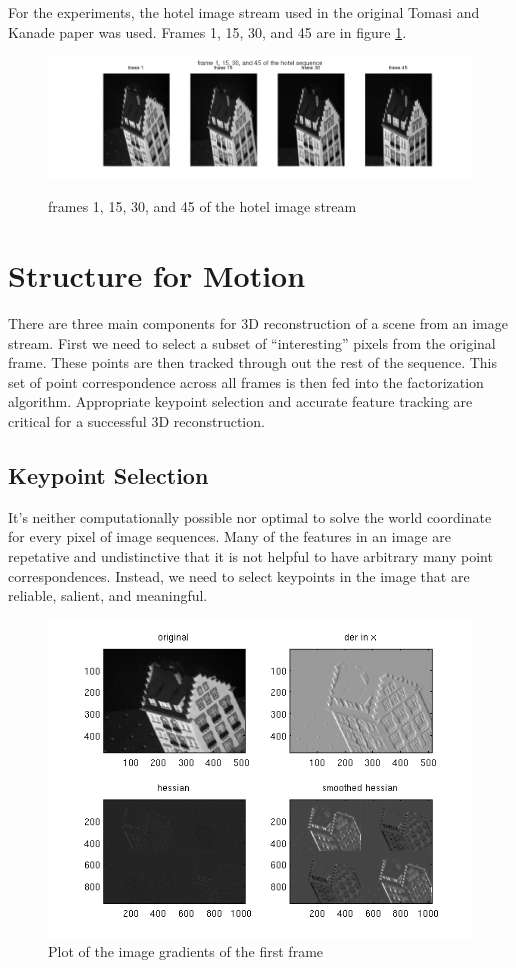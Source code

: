 For the experiments, the hotel image stream used in the original
Tomasi and Kanade paper was used. Frames 1, 15, 30, and 45 are
in figure \ref{fig:hotel}. 
\begin{figure}[!ht]
  \includegraphics[scale=0.5]{hotel.png}
\label{fig:hotel}
  \caption{frames 1, 15, 30, and 45 of the hotel image stream} 
\end{figure}
\section{Structure for Motion}
\label{sec:main}
There are three main components for 3D reconstruction of a scene from
an image stream. First we need to select a subset of
``interesting'' pixels from the original frame. These points are then
tracked through out the rest of the sequence. This set of point
correspondence across all frames is then fed into the factorization algorithm. Appropriate keypoint selection and accurate feature tracking
are critical for a successful 3D reconstruction. 

\subsection{Keypoint Selection}
\label{sec:keypoint-selection}
It's neither computationally possible nor optimal to solve the world coordinate
for every pixel of image sequences. Many of the features in an image are
repetative and undistinctive that it is not helpful to have arbitrary
many point correspondences. Instead, we need to select keypoints in
the image that are reliable, salient, and meaningful. 
\begin{figure}[!ht]
  \begin{center}
  \includegraphics[scale=0.6]{hessian.png}
  \caption{Plot of the image gradients of the first frame} 
  \label{fig:Hessian}
  \end{center}
\end{figure}

